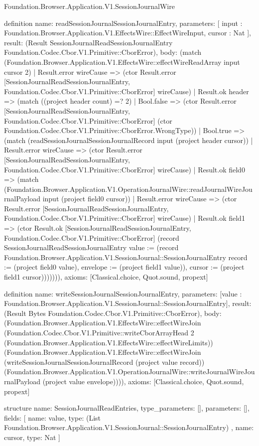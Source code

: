 \begin{lexlean}{Foundation.Browser.Application.V1.SessionJournalWire}
\begin{semanticmodule}
definition{
  name: readSessionJournalSessionJournalEntry,
  parameters: [
    input : Foundation.Browser.Application.V1.EffectsWire::EffectWireInput,
    cursor : Nat
  ],
  result: (Result SessionJournalReadSessionJournalEntry Foundation.Codec.Cbor.V1.Primitive::CborError),
  body: (match (Foundation.Browser.Application.V1.EffectsWire::effectWireReadArray input cursor 2)
    | Result.error wireCause => (ctor Result.error [SessionJournalReadSessionJournalEntry, Foundation.Codec.Cbor.V1.Primitive::CborError] wireCause)
    | Result.ok header => (match ((project header count) =? 2)
      | Bool.false => (ctor Result.error [SessionJournalReadSessionJournalEntry, Foundation.Codec.Cbor.V1.Primitive::CborError] (ctor Foundation.Codec.Cbor.V1.Primitive::CborError.WrongType))
      | Bool.true => (match (readSessionJournalSessionJournalRecord input (project header cursor))
        | Result.error wireCause => (ctor Result.error [SessionJournalReadSessionJournalEntry, Foundation.Codec.Cbor.V1.Primitive::CborError] wireCause)
        | Result.ok field0 => (match (Foundation.Browser.Application.V1.OperationJournalWire::readJournalWireJournalPayload input (project field0 cursor))
          | Result.error wireCause => (ctor Result.error [SessionJournalReadSessionJournalEntry, Foundation.Codec.Cbor.V1.Primitive::CborError] wireCause)
          | Result.ok field1 => (ctor Result.ok [SessionJournalReadSessionJournalEntry, Foundation.Codec.Cbor.V1.Primitive::CborError] (record SessionJournalReadSessionJournalEntry {value := (record Foundation.Browser.Application.V1.SessionJournal::SessionJournalEntry {record := (project field0 value), envelope := (project field1 value)}), cursor := (project field1 cursor)})))))),
  axioms: [Classical.choice, Quot.sound, propext]
}

definition{
  name: writeSessionJournalSessionJournalEntry,
  parameters: [value : Foundation.Browser.Application.V1.SessionJournal::SessionJournalEntry],
  result: (Result Bytes Foundation.Codec.Cbor.V1.Primitive::CborError),
  body: (Foundation.Browser.Application.V1.EffectsWire::effectWireJoin (Foundation.Codec.Cbor.V1.Primitive::writeCborArrayHead 2 (Foundation.Browser.Application.V1.EffectsWire::effectWireLimits)) (Foundation.Browser.Application.V1.EffectsWire::effectWireJoin (writeSessionJournalSessionJournalRecord (project value record)) (Foundation.Browser.Application.V1.OperationJournalWire::writeJournalWireJournalPayload (project value envelope)))),
  axioms: [Classical.choice, Quot.sound, propext]
}

structure{
  name: SessionJournalReadEntries,
  type_parameters: [],
  parameters: [],
  fields: [
    {
      name: value,
      type: (List Foundation.Browser.Application.V1.SessionJournal::SessionJournalEntry)
    },
    {name: cursor, type: Nat}
  ]
}


\end{semanticmodule}
\end{lexlean}
